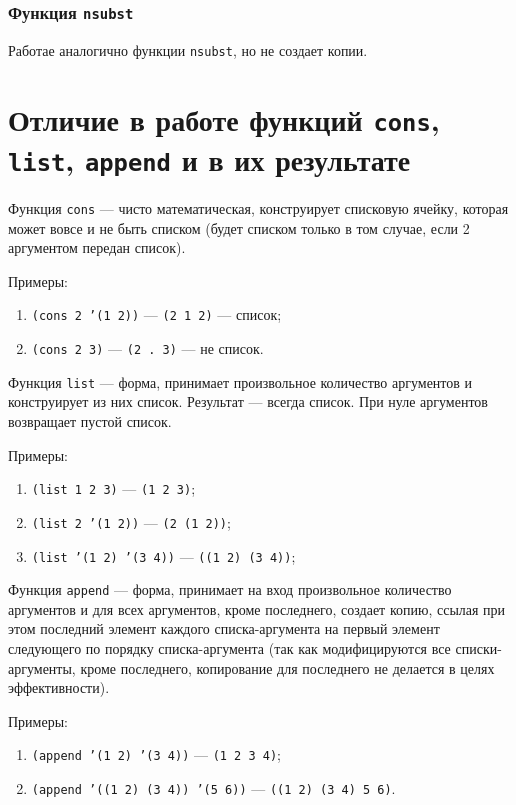 \subsubsection{Функция \texttt{nsubst}}

Работае аналогично функции \texttt{nsubst}, но не создает копии.

\section{Отличие в работе функций \texttt{cons}, \texttt{list}, \texttt{append} и в их результате}

Функция \texttt{cons} --- чисто математическая, конструирует списковую ячейку, которая может вовсе и не быть списком (будет списком только в том случае, если 2 аргументом передан список).

Примеры:
\begin{enumerate}
    \item \texttt{(cons 2 '(1 2))} --- \texttt{(2 1 2)} --- список;
    \item \texttt{(cons 2 3)} --- \texttt{(2 . 3)} --- не список.
\end{enumerate}

Функция \texttt{list} --- форма, принимает произвольное количество аргументов и конструирует из них список. Результат --- всегда список. При нуле аргументов возвращает пустой список.

Примеры:
\begin{enumerate}
    \item \texttt{(list 1 2 3)} --- \texttt{(1 2 3)};
    \item \texttt{(list 2 '(1 2))} --- \texttt{(2 (1 2))};
    \item \texttt{(list '(1 2) '(3 4))} --- \texttt{((1 2) (3 4))};
\end{enumerate}

Функция \texttt{append} --- форма, принимает на вход произвольное количество аргументов и для всех аргументов, кроме последнего, создает копию, ссылая при этом последний элемент каждого списка-аргумента на первый элемент следующего по порядку списка-аргумента (так как модифицируются все списки-аргументы, кроме последнего, копирование для последнего не делается в целях эффективности).

Примеры:
\begin{enumerate}
    \item \texttt{(append '(1 2) '(3 4))} --- \texttt{(1 2 3 4)};
    \item \texttt{(append '((1 2) (3 4)) '(5 6))} --- \texttt{((1 2) (3 4) 5 6)}.
\end{enumerate}
